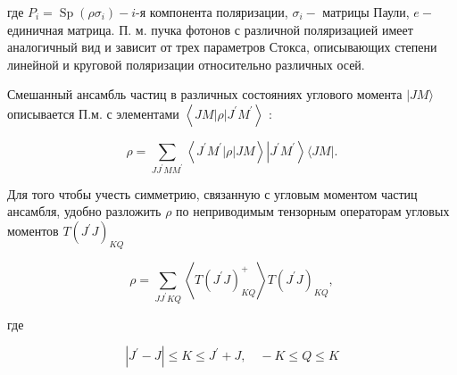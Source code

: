 \documentclass[10pt]{article}
\begin{document}
где $P_{i}=\operatorname{Sp}\left(\rho \sigma_{i}\right)-i$-я компонента поляризации, $\sigma_{i}-$ матрицы Паули, $e-$ единичная матрица. П. м. пучка фотонов с различной поляризацией имеет аналогичный вид и зависит от трех параметров Стокса, описывающих степени линейной и круговой поляризации относительно различных осей.



Смешанный ансамбль частиц в различных состояниях углового момента $|J M\rangle$ описывается П.м. с элементами $\left\langle J M|\rho| J^{\prime} M^{\prime}\right\rangle$ :



\[

\rho=\sum_{J J^{\prime} M M^{\prime}}\left\langle J^{\prime} M^{\prime}|\rho| J M\right\rangle\left|J^{\prime} M^{\prime}\right\rangle\langle J M| .

\]



Для того чтобы учесть симметрию, связанную с угловым моментом частиц ансамбля, удобно разложить $\rho$ по неприводимым тензорным операторам угловых моментов $T\left(J^{\prime} J\right)_{K Q}$



\[

\rho=\sum_{J J^{\prime} K Q}\left\langle T\left(J^{\prime} J\right)_{K Q}^{+}\right\rangle T\left(J^{\prime} J\right)_{K Q},

\]



где



\[

\left|J^{\prime}-J\right| \leqslant K \leqslant J^{\prime}+J, \quad-K \leqslant Q \leqslant K

\]
\end{document}
